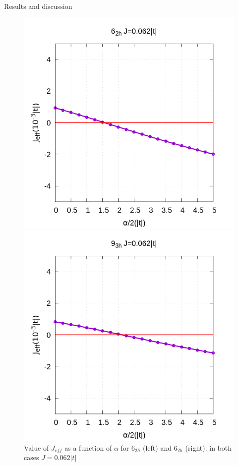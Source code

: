\documentclass[12pt,twoside]{report}
\begin{document}
\begin{chapter}{Results and discussion}
	\begin{figure}[h!]
		\centering
		\hspace{-2cm}
		\begin{minipage}{0.4\textwidth}
			\includegraphics[scale=0.3]{Jeff_vs_xrep_ar2.png}
		\end{minipage}
		\hspace{2cm}
		\begin{minipage}{0.4\textwidth}
			\includegraphics[scale=0.3]{Jeff_vs_xrep_ar3.png}
		\end{minipage}
		\caption{\label{fig_arxrep} Value of $J_{eff}$ as a function of $\alpha$ for 6$_{2h}$ (left) and 6$_{2h}$ (right). in both cases $J=0.062 |t|$ }
	\end{figure}


\end{chapter}
\end{document}
